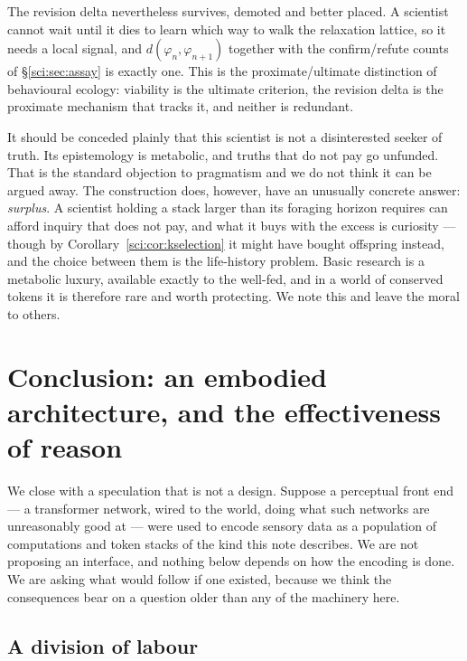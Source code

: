 The revision delta nevertheless survives, demoted and better placed. A scientist cannot wait until it
dies to learn which way to walk the relaxation lattice, so it needs a local signal, and
$d(\varphi_n, \varphi_{n+1})$ together with the confirm/refute counts of \S\ref{sci:sec:assay} is exactly
one. This is the proximate/ultimate distinction of behavioural ecology: viability is the ultimate
criterion, the revision delta is the proximate mechanism that tracks it, and neither is redundant.

\begin{remark}
\label{sci:rem:pragmatist}
It should be conceded plainly that this scientist is not a disinterested seeker of truth. Its
epistemology is metabolic, and truths that do not pay go unfunded. That is the standard objection to
pragmatism and we do not think it can be argued away. The construction does, however, have an unusually
concrete answer: \emph{surplus}. A scientist holding a stack larger than its foraging horizon requires
can afford inquiry that does not pay, and what it buys with the excess is curiosity --- though by
Corollary~\ref{sci:cor:kselection} it might have bought offspring instead, and the choice between them is
the life-history problem. Basic research is
a metabolic luxury, available exactly to the well-fed, and in a world of conserved tokens it is
therefore rare and worth protecting. We note this and leave the moral to others.
\end{remark}

\section{Conclusion: an embodied architecture, and the effectiveness of reason}\label{sci:S17}
\label{sci:sec:conclusion}

We close with a speculation that is not a design. Suppose a perceptual front end --- a transformer
network, wired to the world, doing what such networks are unreasonably good at --- were used to encode
sensory data as a population of computations and token stacks of the kind this note describes. We are
not proposing an interface, and nothing below depends on how the encoding is done. We are asking what
would follow if one existed, because we think the consequences bear on a question older than any of
the machinery here.

\subsection{A division of labour}\label{sci:S17.1}

